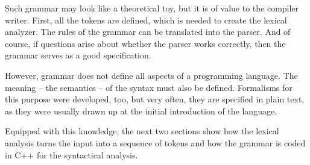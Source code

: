 
Such grammar may look like a theoretical toy, but it is of value to the compiler writer. First, all the tokens are defined, which is needed to create the lexical analyzer. The rules of the grammar can be translated into the parser. And of course, if questions arise about whether the parser works correctly, then the grammar serves as a good specification.

However, grammar does not define all aspects of a programming language. The meaning – the semantics – of the syntax must also be defined. Formalisms for this purpose were developed, too, but very often, they are specified in plain text, as they were usually drawn up at the initial introduction of the language.

Equipped with this knowledge, the next two sections show how the lexical analysis turns the input into a sequence of tokens and how the grammar is coded in C++ for the syntactical analysis.